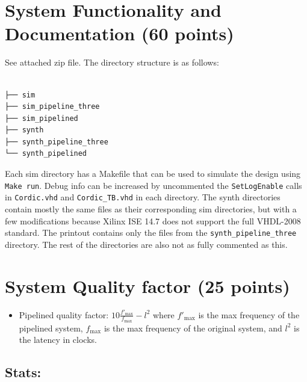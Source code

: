 \documentclass[
  10pt,
]{article}
\author{}
\date{}
\providecommand{\tightlist}{%
  \setlength{\itemsep}{0pt}\setlength{\parskip}{0pt}}
\begin{document}
\section{System Functionality and Documentation (60
points)}\label{system-functionality-and-documentation-60-points}

See attached zip file. The directory structure is as follows:

\begin{verbatim}

├── sim
├── sim_pipeline_three
├── sim_pipelined
├── synth
├── synth_pipeline_three
└── synth_pipelined
\end{verbatim}

Each sim directory has a Makefile that can be used to simulate the
design using \texttt{Make\ run}. Debug info can be increased by
uncommented the \texttt{SetLogEnable} calls in \texttt{Cordic.vhd} and
\texttt{Cordic\_TB.vhd} in each directory. The synth directories contain
mostly the same files as their corresponding sim directories, but with a
few modifications because Xilinx ISE 14.7 does not support the full
VHDL-2008 standard. The printout contains only the files from the
\texttt{synth\_pipeline\_three} directory. The rest of the directories
are also not as fully commented as this.

\section{System Quality factor (25
points)}\label{system-quality-factor-25-points}

\begin{itemize}
\tightlist
\item
  Pipelined quality factor:
  \(10\frac{f'_{\text{max}}}{f_{\text{max}}}-l^{2}\) where
  \(f'_{\text{max}}\) is the max frequency of the pipelined system,
  \(f_{\text{max}}\) is the max frequency of the original system, and
  \(l^2\) is the latency in clocks.
\end{itemize}

\subsection{Stats:}\label{stats}
\end{document}
